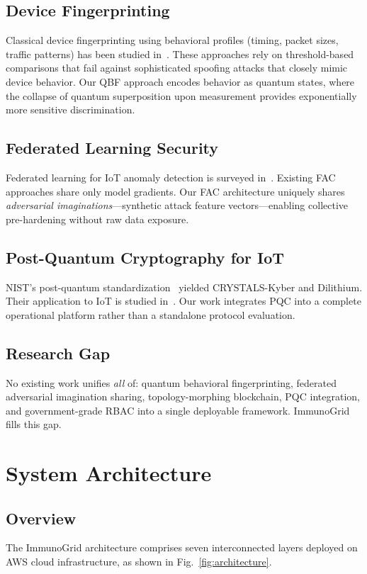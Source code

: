 \documentclass[journal]{IEEEtran}
\begin{document}
\subsection{Device Fingerprinting}
Classical device fingerprinting using behavioral profiles (timing, packet
sizes, traffic patterns) has been studied in~\cite{ref_device_fp}. These
approaches rely on threshold-based comparisons that fail against sophisticated
spoofing attacks that closely mimic device behavior. Our QBF approach encodes
behavior as quantum states, where the collapse of quantum superposition upon
measurement provides exponentially more sensitive discrimination.

\subsection{Federated Learning Security}
Federated learning for IoT anomaly detection is surveyed
in~\cite{ref_fl_iot}. Existing FAC approaches share only model gradients.
Our FAC architecture uniquely shares \emph{adversarial imaginations}—synthetic
attack feature vectors—enabling collective pre-hardening without raw data
exposure.

\subsection{Post-Quantum Cryptography for IoT}
NIST's post-quantum standardization~\cite{ref_pqc_nist} yielded
CRYSTALS-Kyber and Dilithium. Their application to IoT is studied
in~\cite{ref_pqc_iot}. Our work integrates PQC into a complete operational
platform rather than a standalone protocol evaluation.

\subsection{Research Gap}
No existing work unifies \emph{all} of: quantum behavioral fingerprinting,
federated adversarial imagination sharing, topology-morphing blockchain, PQC
integration, and government-grade RBAC into a single deployable framework.
ImmunoGrid fills this gap.


\section{System Architecture}
\label{sec:arch}

\subsection{Overview}
The ImmunoGrid architecture comprises seven interconnected layers deployed
on AWS cloud infrastructure, as shown in Fig.~\ref{fig:architecture}.
\end{document}
